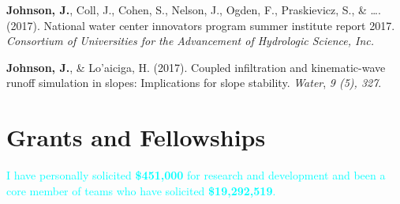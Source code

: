 \documentclass[11pt,a4paper,]{awesome-cv}
\begin{document}
\leavevmode{}%
\textbf{Johnson, J.}, Coll, J., Cohen, S., Nelson, J., Ogden, F.,
Praskievicz, S., \& \ldots. (2017). National water center innovators
program summer institute report 2017. \emph{Consortium of Universities
for the Advancement of Hydrologic Science, Inc.}

\leavevmode{}%
\textbf{Johnson, J.}, \& Lo'aiciga, H. (2017). Coupled infiltration and
kinematic-wave runoff simulation in slopes: Implications for slope
stability. \emph{Water}, \emph{9 (5), 327}.

\newpage

\hypertarget{grants-and-fellowships}{%
\section{Grants and Fellowships}\label{grants-and-fellowships}}

\textcolor{cyan}{I have personally solicited \textbf{\$451,000} for research and development and been a core member of teams who have solicited \textbf{\$19,292,519}.}
\end{document}
